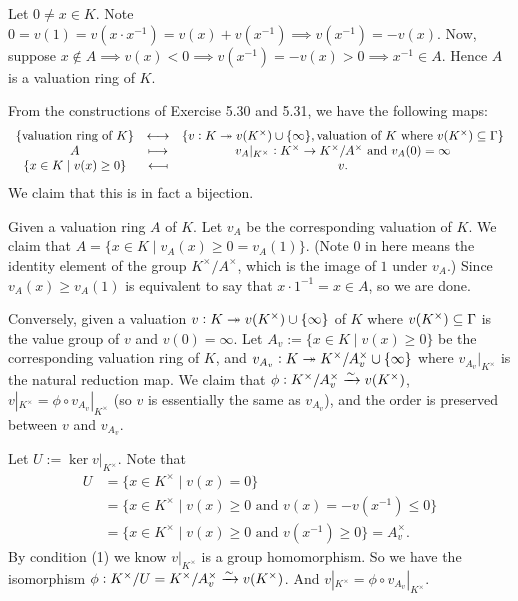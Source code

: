 \documentclass[../A&M.tex]{subfiles}
\begin{document}
Let $0 \neq x \in K$. Note $0 = v(1) = v(x\cdot x^{-1}) = v(x) + v(x^{-1}) \implies v(x^{-1}) = -v(x)$. Now, suppose $x\notin A \implies v(x) < 0 \implies v(x^{-1}) = -v(x) > 0 \implies x^{-1} \in A$. Hence $A$ is a valuation ring of $K$.

From the constructions of Exercise 5.30 and 5.31, we have the following maps:
$$
\begin{array}{ccc}
\{ \text{valuation ring of } K\} & \longleftrightarrow & \{v:K \twoheadrightarrow v(K^\times) \cup \{\infty\}, \text{valuation of } K \text{ where } v(K^\times) \subseteq \Gamma \}   \\
A & \longmapsto & v_A|_{K^\times}: K^\times \to K^\times/A^\times \text{ and } v_A(0) = \infty     \\
\{x \in K \mid v(x) \geq 0\} & \longmapsfrom & v.
\end{array}
$$
We claim that this is in fact a bijection.

Given a valuation ring $A$ of $K$. Let $v_A$ be the corresponding valuation of $K$. We claim that $A = \{ x\in K \mid v_A(x) \geq 0 = v_A(1) \}$. (Note $0$ in here means the identity element of the group $K^\times/A^\times$, which is the image of $1$ under $v_A$.) Since $v_A(x) \geq v_A(1)$ is equivalent to say that $x \cdot 1^{-1} = x \in A$, so we are done.

Conversely, given a valuation $v:K \twoheadrightarrow v(K^\times) \cup \{\infty\}$ of $K$ where $v(K^\times) \subseteq \Gamma$ is the value group of $v$ and $v(0)=\infty$. Let $A_v := \{x \in K \mid v(x) \geq 0\}$ be the corresponding valuation ring of $K$, and $v_{A_v}: K \twoheadrightarrow K^\times/A_v^\times \cup \{\infty\}$ where $v_{A_v}|_{K^\times}$ is the natural reduction map. We claim that $\phi: K^\times/A_v^\times \xrightarrow{\sim} v(K^\times)  $, $v|_{K^\times} = \phi \circ v_{A_v}|_{K^\times}$ (so $v$ is essentially the same as $v_{A_v}$), and the order is preserved between $v$ and $v_{A_v}$.

Let $U:=\ker v|_{K^\times}$. Note that
\begin{align*}
U &= \{ x \in K^\times \mid v(x)=0 \}    \\
&= \{ x \in K^\times \mid v(x) \geq 0 \text{ and } v(x) = -v(x^{-1}) \leq 0 \}     \\
&= \{ x \in K^\times \mid v(x) \geq 0 \text{ and } v(x^{-1}) \geq 0 \} 
= A_v^\times.  
\end{align*}
By condition (1) we know $v|_{K^\times}$ is a group homomorphism. So we have the isomorphism $\phi: K^\times/U = K^\times/A_v^\times \xrightarrow{\sim} v(K^\times)$. And $v|_{K^\times} = \phi \circ v_{A_v}|_{K^\times}$.
\end{document}
